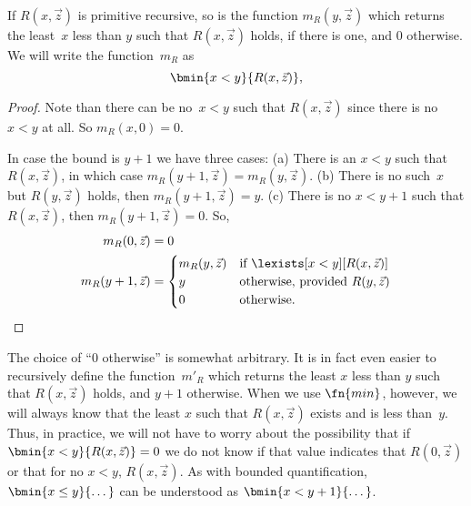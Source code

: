 \documentclass[../../include/open-logic-section]{subfiles}
\begin{document}


\begin{prop}
If $R(x, \vec z)$ is primitive recursive, so is the function $m_R(y,
\vec{z})$ which returns the least~$x$ less than $y$ such that
$R(x,\vec{z})$ holds, if there is one, and 0 otherwise.  We will write
the function~$m_R$ as
\[
\bmin{x < y}{R(x, \vec{z})},
\]
\end{prop}

\begin{proof}
Note than there can be no~$x < y$ such that $R(x, \vec{z})$ since
there is no $x < y$ at all.  So $m_R(x, 0) = 0$.

In case the bound is $y + 1$ we have three cases: (a) There is an $x <
y$ such that $R(x, \vec{z})$, in which case $m_R(y+1, \vec{z}) =
m_R(y, \vec{z})$. (b) There is no such~$x$ but $R(y, \vec{z})$ holds, then
$m_R(y+1, \vec{z}) = y$. (c) There is no $x < y+1$ such that $R(x,
\vec{z})$, then $m_R(y+1,\vec{z}) = 0$. So,
\begin{align*}
m_R(0, \vec{z}) & = 0\\
m_R(y+1, \vec{z}) & = 
\begin{cases}
m_R(y, \vec{z}) & \text{if $\lexists[x < y][R(x, \vec{z})]$} \\
y & \text{otherwise, provided $R(y, \vec{z})$}\\
0 & \text{otherwise.}
\end{cases}
\end{align*}
\end{proof}

\begin{explain}
The choice of ``$0$ otherwise'' is somewhat arbitrary. It is in fact
even easier to recursively define the function~$m'_R$ which returns
the least $x$ less than $y$ such that $R(x,\vec z)$ holds, and $y+1$
otherwise.  When we use $\fn{min}$, however, we will always know that
the least $x$ such that $R(x, \vec z)$ exists and is less
than~$y$. Thus, in practice, we will not have to worry about the
possibility that if $\bmin{x<y}{R(x, \vec{z})} = 0$ we do not know if that
value indicates that $R(0, \vec z)$ or that for no $x < y$, $R(x, \vec
z)$. As with bounded quantification, $\bmin{x \leq y}{\dots}$
can be understood as $\bmin{x < y + 1}{\dots}$.
\end{explain}
\end{document}
